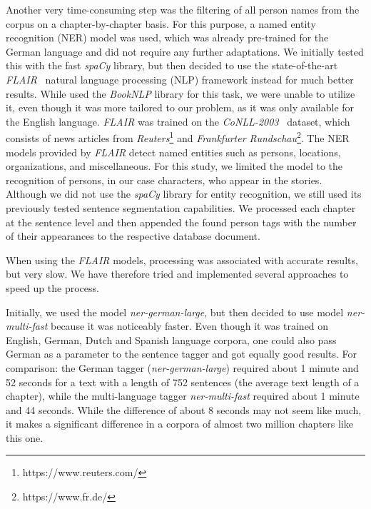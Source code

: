 Another very time-consuming step was the filtering of all person names from the corpus on a chapter-by-chapter basis.
For this purpose, a named entity recognition (NER) model was used, which was already pre-trained for the German language and did not require any further adaptations.
We initially tested this with the fast \emph{spaCy} library, but then decided to use the state-of-the-art \emph{FLAIR}~\citep{Akbik2019FLAIR:NLP} natural language processing (NLP) framework instead for much better results.
While \citet{Milli2016BeyondFanfiction} used the \emph{BookNLP}\citep{Bamman2014ACharacter} library for this task, we were unable to utilize it, even though it was more tailored to our problem, as it was only available for the English language.
\emph{FLAIR} was trained on the \emph{CoNLL-2003}~\citep{TjongKimSang2003IntroductionRecognition} dataset, which consists of news articles from \emph{Reuters}\footnote{https://www.reuters.com/} and \emph{Frankfurter Rundschau}\footnote{https://www.fr.de/}.
The NER models provided by \emph{FLAIR} detect named entities such as persons, locations, organizations, and miscellaneous.
For this study, we limited the model to the recognition of persons, in our case characters, who appear in the stories.
Although we did not use the \emph{spaCy} library for entity recognition, we still used its previously tested sentence segmentation capabilities.
We processed each chapter at the sentence level and then appended the found person tags with the number of their appearances to the respective database document.

When using the \emph{FLAIR} models, processing was associated with accurate results, but very slow.
We have therefore tried and implemented several approaches to speed up the process.

Initially, we used the model \emph{ner-german-large}, but then decided to use model \emph{ner-multi-fast} because it was noticeably faster.
Even though it was trained on English, German, Dutch and Spanish language corpora, one could also pass German as a parameter to the sentence tagger and got equally good results.
For comparison: the German tagger (\emph{ner-german-large}) required about 1 minute and 52 seconds for a text with a length of 752 sentences (the average text length of a chapter), while the multi-language tagger \emph{ner-multi-fast} required about 1 minute and 44 seconds.
While the difference of about 8 seconds may not seem like much, it makes a significant difference in a corpora of almost two million chapters like this one.


